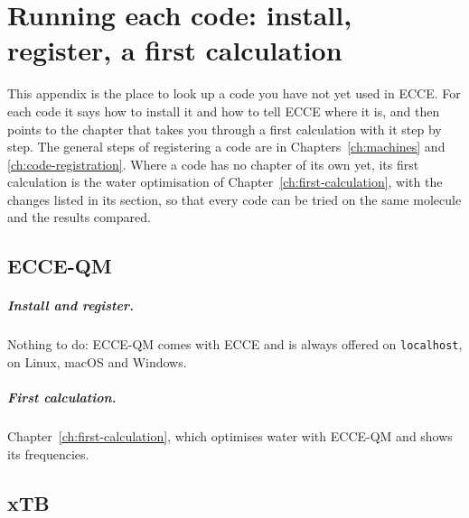\chapter{Running each code: install, register, a first calculation}
\label{ch:running-each-code}

This appendix is the place to look up a code you have not yet used in ECCE. For each code it says how to install it and how to tell ECCE where it is, and then points to the chapter that takes you through a first calculation with it step by step. The general steps of registering a code are in Chapters~\ref{ch:machines} and \ref{ch:code-registration}. Where a code has no chapter of its own yet, its first calculation is the water optimisation of Chapter~\ref{ch:first-calculation}, with the changes listed in its section, so that every code can be tried on the same molecule and the results compared.

\section{ECCE-QM}
\label{sec:run-ecceqm}
\paragraph{Install and register.} Nothing to do: ECCE-QM comes with ECCE and is always offered on \texttt{localhost}, on Linux, macOS and Windows.

\paragraph{First calculation.} Chapter~\ref{ch:first-calculation}, which optimises water with ECCE-QM and shows its frequencies.

\section{xTB}
\label{sec:run-xtb}
